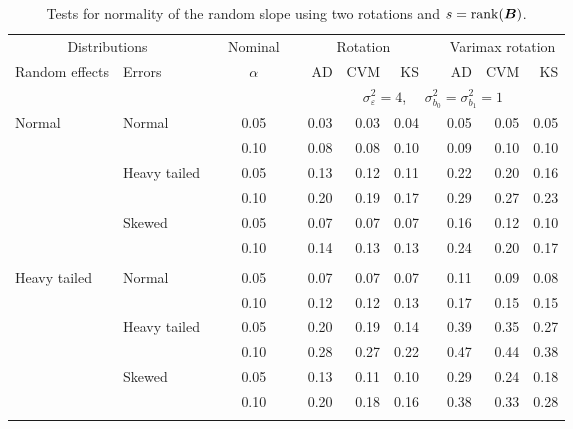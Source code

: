 \begin{table}[ht]
\caption{\label{tab:simb1sB}Tests for normality of the random slope using two rotations and $s = \operatorname{rank}(\bm{B})$.}
\begin{scriptsize}
\begin{center}
\begin{tabular}{ll p{.1cm} c p{.1cm} rrr p{.1cm} rrr}
  \hline
  \multicolumn{2}{c}{Distributions}& & Nominal & &  \multicolumn{3}{c}{Rotation} & & \multicolumn{3}{c}{Varimax rotation} \\ \cline{1-2} \cline{6-8} \cline{10-12}   
  Random effects & Errors & & $\alpha$ & & AD & CVM & KS & & AD & CVM & KS \\ 
   \hline
& && && \multicolumn{7}{c}{$\sigma_{\varepsilon}^2 = 4$, \ \ $\sigma_{b_0}^2 = \sigma_{b_1}^2 = 1$} \\ \cline{6-12}
\rowcolor{gray!20}Normal       & Normal       && 0.05 &&  0.03 & 0.03 & 0.04 && 0.05 & 0.05 & 0.05 \\ 
\rowcolor{gray!20}             &              && 0.10 &&  0.08 & 0.08 & 0.10 && 0.09 & 0.10 & 0.10 \\ 
\rowcolor{gray!20}             & Heavy tailed && 0.05 &&  0.13 & 0.12 & 0.11 && 0.22 & 0.20 & 0.16 \\ 
\rowcolor{gray!20}             &              && 0.10 &&  0.20 & 0.19 & 0.17 && 0.29 & 0.27 & 0.23 \\ 
\rowcolor{gray!20}             & Skewed       && 0.05 &&  0.07 & 0.07 & 0.07 && 0.16 & 0.12 & 0.10 \\ 
\rowcolor{gray!20}             &              && 0.10 &&  0.14 & 0.13 & 0.13 && 0.24 & 0.20 & 0.17 \\ 
             &&&&&&&&&&&\\
Heavy tailed & Normal       && 0.05 &&  0.07 & 0.07 & 0.07 && 0.11 & 0.09 & 0.08 \\ 
             &              && 0.10 &&  0.12 & 0.12 & 0.13 && 0.17 & 0.15 & 0.15 \\ 
             & Heavy tailed && 0.05 &&  0.20 & 0.19 & 0.14 && 0.39 & 0.35 & 0.27 \\ 
             &              && 0.10 &&  0.28 & 0.27 & 0.22 && 0.47 & 0.44 & 0.38 \\ 
             & Skewed       && 0.05 &&  0.13 & 0.11 & 0.10 && 0.29 & 0.24 & 0.18 \\ 
             &              && 0.10 &&  0.20 & 0.18 & 0.16 && 0.38 & 0.33 & 0.28 \\ 
             &&&&&&&&&&&\\

\end{tabular}
\end{center}
\end{scriptsize}
\end{table}
